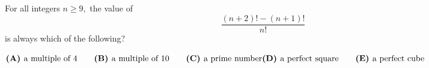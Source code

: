 For all integers $n \geq 9,$ the value of 
$$\frac{(n+2)!-(n+1)!}{n!}$$
is always which of the following?

$\textbf{(A) } \text{a multiple of }4 \qquad \textbf{(B) } \text{a multiple of }10 \qquad \textbf{(C) } \text{a prime number} \\ \textbf{(D) } \text{a perfect square} \qquad \textbf{(E) } \text{a perfect cube}$
